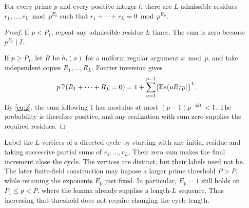 \begin{lemma}\label{local:cycles}
For every prime \(p\) and every positive integer \(l\), there are
\(L\) admissible residues \(r_1,\ldots,r_L\bmod p^{E_p}\) such that
\(r_1+\cdots+r_L=0\bmod p^{E_p}\).
\end{lemma}

\begin{proof}
If \(p<P_1\), repeat any admissible residue \(L\) times. The sum is zero
because \(p^{E_p}\mid L\).

If \(p\ge P_1\), let \(R\) be \(h_l(x)\) for a uniform regular
argument \(x\bmod p\), and take independent copies \(R_1,\ldots,R_L\).
Fourier inversion gives
\[
 p\,\mathbb P(R_1+\cdots+R_L=0)
 =1+\sum_{u=1}^{p-1}\bigl(\mathbb E e(uR/p)\bigr)^L.
\]
By \eqref{eq:2}, the sum following \(1\) has modulus at most
\((p-1)p^{-4\delta L}<1\). The probability is therefore positive, and
any realization with sum zero supplies the required residues.
\end{proof}

Label the \(L\) vertices of a directed cycle by starting with any initial
residue and taking successive partial sums of \(r_1,\ldots,r_L\). Their
zero sum makes the final increment close the cycle. The vertices are
distinct, but their labels need not be. The later finite-field construction
may impose a larger prime threshold \(P>P_1\) while retaining the exponents
\(E_p\) just fixed. In particular, \(E_p=1\) still holds on
\(P_1\le p<P\), where the lemma already supplies a length-\(L\) sequence.
Thus increasing that threshold does not require changing the cycle length.
